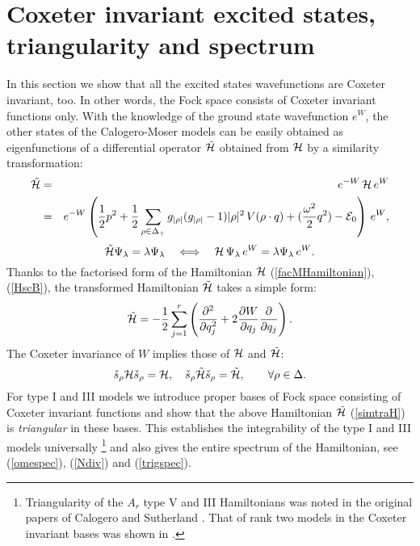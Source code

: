\documentclass[a4paper,12pt]{article}
\begin{document}
\section{Coxeter invariant excited states, triangularity and spectrum}
\label{coxinv}
\setcounter{equation}{0}
In this section we show that all the excited states wavefunctions
are Coxeter invariant, too.
In other words, the Fock space consists of Coxeter invariant functions
only. With the knowledge of the ground state wavefunction
\(e^W\), the other states of the
Calogero-Moser models can be easily obtained as  eigenfunctions of a
differential operator
\(\tilde{\cal H}\) obtained from
\({\cal
H}\) by a similarity transformation:
\begin{eqnarray}
   \tilde{\cal H}&=&
   e^{-W}\,{\cal H}\,e^W\nonumber\\
   &=&e^{-W}\left({1\over 2} p^{2} +
   {1\over2}\sum_{\rho\in\Delta_+}
   g_{|\rho|}(g_{|\rho|}-1) |\rho|^{2}
   \,V(\rho\cdot q)+({\omega^2\over2}q^2)-{\cal E}_0\right)\,e^W,
\end{eqnarray}
\begin{equation}
   \tilde{\cal H}\Psi_{\lambda}=\lambda\Psi_{\lambda} \quad
   \Longleftrightarrow\quad
   {\cal H}\,\Psi_{\lambda}\,e^W=\lambda\Psi_{\lambda}\,e^W.
   \label{neweq}
\end{equation}
Thanks to the factorised form of the Hamiltonian \({\cal H}\)
(\ref{facMHamiltonian}), (\ref{HscB}), the transformed Hamiltonian
\(\tilde{\cal H}\) takes a simple form:
\begin{equation}
   \tilde{\cal H}=-{1\over2}\sum_{j=1}^r\left(
   {\partial^2\over{\partial q_j^2}}+2{\partial W\over{\partial q_j}}
   {\partial\over{\partial q_j}}\right).
   \label{simtraH}
\end{equation}
The Coxeter invariance of \(W\) implies those of \({\cal H}\) and
\(\tilde{\cal H}\):
\begin{equation}
   \check{s}_{\rho}{\cal H}\check{s}_{\rho}={\cal H}, \quad
   \check{s}_{\rho}\tilde{\cal H}\check{s}_{\rho}=\tilde{\cal H},\qquad
   \forall
   \rho\in\Delta.
   \label{Htilinv}
\end{equation}
For type I and III models we introduce proper bases of Fock space
consisting of Coxeter invariant functions and show that the above
Hamiltonian \(\tilde{\cal H}\) (\ref{simtraH}) is {\em triangular\/} in
these
bases.
This establishes the integrability of the type I and III models
universally
\footnote{Triangularity of the \(A_r\) type V and III Hamiltonians
was noted in the original papers of Calogero \cite{Cal} and Sutherland
\cite{Sut}. That of rank two models in the Coxeter invariant bases was
shown in \cite{HeOp,ruhl}.}
and also gives the entire spectrum  of the Hamiltonian, see
(\ref{omespec}), (\ref{Ndiv}) and (\ref{trigspec}).
\end{document}
